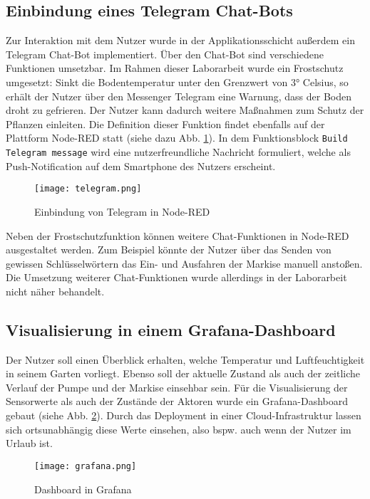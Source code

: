 \subsection{Einbindung eines Telegram Chat-Bots}

Zur Interaktion mit dem Nutzer wurde in der Applikationsschicht außerdem ein Telegram Chat-Bot implementiert. Über den Chat-Bot sind verschiedene Funktionen umsetzbar. Im Rahmen dieser Laborarbeit wurde ein Frostschutz umgesetzt: Sinkt die Bodentemperatur unter den Grenzwert von 3° Celsius, so erhält der Nutzer über den Messenger Telegram eine Warnung, dass der Boden droht zu gefrieren. Der Nutzer kann dadurch weitere Maßnahmen zum Schutz der Pflanzen einleiten. Die Definition dieser Funktion findet ebenfalls auf der Plattform Node-RED statt (siehe dazu Abb. \ref{fig:telegram}). In dem Funktionsblock \texttt{Build Telegram message} wird eine nutzerfreundliche Nachricht formuliert, welche als Push-Notification auf dem Smartphone des Nutzers erscheint.

\begin{figure}[h]
  \centering
  \texttt{[image: telegram.png]}
  \caption{Einbindung von Telegram in Node-RED}\label{fig:telegram}
\end{figure}

Neben der Frostschutzfunktion können weitere Chat-Funktionen in Node-RED ausgestaltet werden. Zum Beispiel könnte der Nutzer über das Senden von gewissen Schlüsselwörtern das Ein- und Ausfahren der Markise manuell anstoßen. Die Umsetzung weiterer Chat-Funktionen wurde allerdings in der Laborarbeit nicht näher behandelt.

\subsection{Visualisierung in einem Grafana-Dashboard}

Der Nutzer soll einen Überblick erhalten, welche Temperatur und Luftfeuchtigkeit in seinem Garten vorliegt. Ebenso soll der aktuelle Zustand als auch der zeitliche Verlauf der Pumpe und der Markise einsehbar sein.
Für die Visualisierung der Sensorwerte als auch der Zustände der Aktoren wurde ein Grafana-Dashboard gebaut (siehe Abb. \ref{fig:grafana}). Durch das Deployment in einer Cloud-Infrastruktur lassen sich ortsunabhängig diese Werte einsehen, also bspw. auch wenn der Nutzer im Urlaub ist.

\begin{figure}[h]
  \centering
  \texttt{[image: grafana.png]}
  \caption{Dashboard in Grafana}\label{fig:grafana}
\end{figure}

